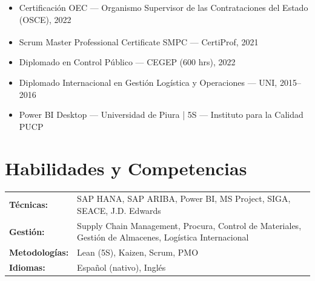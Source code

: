 \documentclass[10.5pt,letterpaper]{article}
\begin{document}
\begin{itemize}
  \item Certificación OEC — Organismo Supervisor de las Contrataciones del Estado (OSCE), 2022
  \item Scrum Master Professional Certificate SMPC\textsuperscript{\textregistered} — CertiProf, 2021
  \item Diplomado en Control Público — CEGEP (600 hrs), 2022
  \item Diplomado Internacional en Gestión Logística y Operaciones — UNI, 2015--2016
  \item Power BI Desktop — Universidad de Piura | 5S — Instituto para la Calidad PUCP
\end{itemize}
\vspace{0.1em}

\section{Habilidades y Competencias}

\begin{tabularx}{\textwidth}{@{}l X@{}}
\textbf{Técnicas:} & SAP HANA, SAP ARIBA, Power BI, MS Project, SIGA, SEACE, J.D. Edwards \\
\textbf{Gestión:} & Supply Chain Management, Procura, Control de Materiales, Gestión de Almacenes, Logística Internacional \\
\textbf{Metodologías:} & Lean (5S), Kaizen, Scrum, PMO \\
\textbf{Idiomas:} & Español (nativo), Inglés \\
\end{tabularx}
\end{document}
